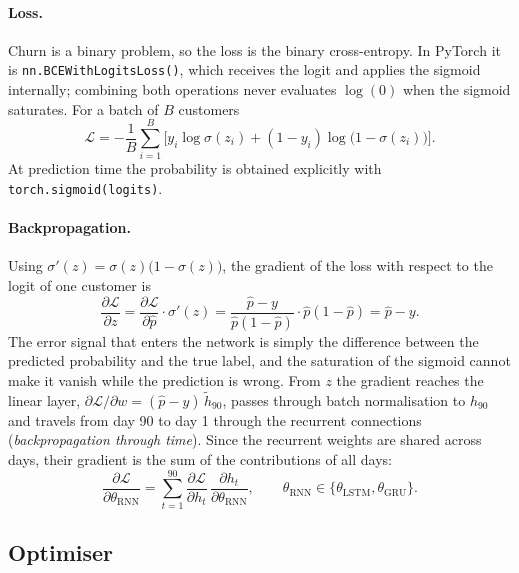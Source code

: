 \documentclass{article}
\begin{document}
\paragraph{Loss.} Churn is a binary problem, so the loss is the binary cross-entropy. In PyTorch it is \texttt{nn.BCEWithLogitsLoss()}, which receives the logit and applies the sigmoid internally; combining both operations never evaluates $\log(0)$ when the sigmoid saturates. For a batch of $B$ customers
\begin{equation}
\mathcal{L} = -\frac{1}{B} \sum_{i=1}^{B} \Big[ y_i \log \sigma(z_i) + (1 - y_i) \log\big(1 - \sigma(z_i)\big) \Big].
\end{equation}
At prediction time the probability is obtained explicitly with \texttt{torch.sigmoid(logits)}.

\paragraph{Backpropagation.} Using $\sigma'(z) = \sigma(z)\big(1 - \sigma(z)\big)$, the gradient of the loss with respect to the logit of one customer is
\begin{equation}
\frac{\partial \mathcal{L}}{\partial z} = \frac{\partial \mathcal{L}}{\partial \hat p} \cdot \sigma'(z) = \frac{\hat p - y}{\hat p (1 - \hat p)} \cdot \hat p (1 - \hat p) = \hat p - y .
\end{equation}
The error signal that enters the network is simply the difference between the predicted probability and the true label, and the saturation of the sigmoid cannot make it vanish while the prediction is wrong. From $z$ the gradient reaches the linear layer, $\partial \mathcal{L} / \partial w = (\hat p - y)\, \tilde h_{90}$, passes through batch normalisation to $h_{90}$ and travels from day 90 to day 1 through the recurrent connections (\emph{backpropagation through time}). Since the recurrent weights are shared across days, their gradient is the sum of the contributions of all days:
\begin{equation}
\frac{\partial \mathcal{L}}{\partial \theta_{\text{RNN}}} = \sum_{t=1}^{90} \frac{\partial \mathcal{L}}{\partial h_t} \, \frac{\partial h_t}{\partial \theta_{\text{RNN}}},
\qquad \theta_{\text{RNN}} \in \{\theta_{\text{LSTM}},\theta_{\text{GRU}}\}.
\end{equation}

\subsection{Optimiser}
\end{document}
